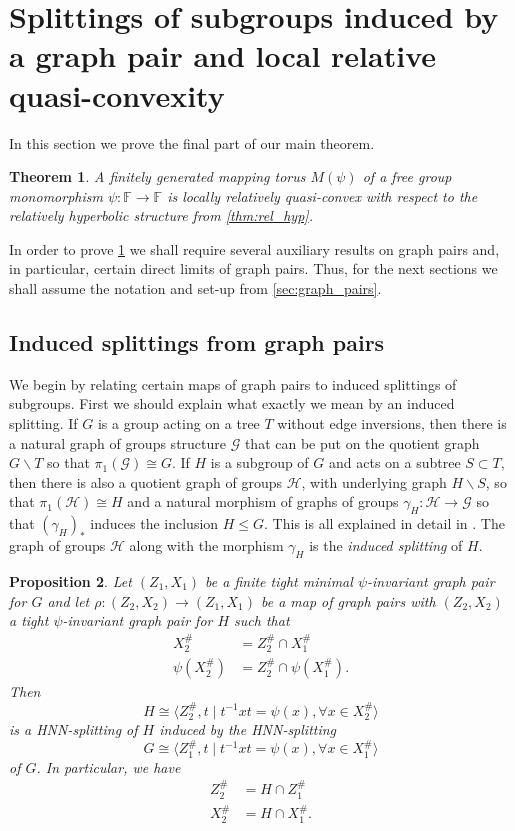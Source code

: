 \documentclass[11pt, a4paper]{amsart}
\newtheorem{theorem}{Theorem}[section]
\newtheorem{proposition}[theorem]{Proposition}
\theoremstyle{definition}
\newcommand{\isom}{\cong}
\newcommand{\F}{\mathbb{F}}
\begin{document}
\section{Splittings of subgroups induced by a graph pair and local relative quasi-convexity}
\label{sec:locally_rel_qc}

In this section we prove the final part of our main theorem.

\begin{theorem}
\label{thm:locally_rel_qc}
A finitely generated mapping torus $M(\psi)$ of a free group monomorphism $\psi\colon \F\to \F$ is locally relatively quasi-convex with respect to the relatively hyperbolic structure from \cref{thm:rel_hyp}.
\end{theorem}

In order to prove \cref{thm:locally_rel_qc} we shall require several auxiliary results on graph pairs and, in particular, certain direct limits of graph pairs. Thus, for the next sections we shall assume the notation and set-up from \cref{sec:graph_pairs}.

\subsection{Induced splittings from graph pairs}

We begin by relating certain maps of graph pairs to induced splittings of subgroups. First we should explain what exactly we mean by an induced splitting. If $G$ is a group acting on a tree $T$ without edge inversions, then there is a natural graph of groups structure $\mathcal{G}$ that can be put on the quotient graph $G\backslash T$ so that $\pi_1(\mathcal{G}) \isom G$. If $H$ is a subgroup of $G$ and acts on a subtree $S\subset T$, then there is also a quotient graph of groups $\mathcal{H}$, with underlying graph $H\backslash S$, so that $\pi_1(\mathcal{H}) \isom H$ and a natural morphism of graphs of groups $\gamma_H\colon \mathcal{H}\to\mathcal{G}$ so that $(\gamma_H)_*$ induces the inclusion $H\leqslant G$. This is all explained in detail in \cite{Se80,Ba93}. The graph of groups $\mathcal{H}$ along with the morphism $\gamma_H$ is the \emph{induced splitting} of $H$.

\begin{proposition}
\label{prop:intersection}
Let $(Z_1, X_1)$ be a finite tight minimal $\psi$-invariant graph pair for $G$ and let $\rho\colon (Z_2, X_2)\to (Z_1, X_1)$ be a map of graph pairs with $(Z_2, X_2)$ a tight $\psi$-invariant graph pair for $H$ such that
\begin{align*}
X_2^{\#} &= Z_2^{\#}\cap X_1^{\#}\\
\psi(X_2^{\#}) &= Z_2^{\#}\cap \psi(X_1^{\#}).
\end{align*}
Then
\[
H\isom \langle Z_2^{\#}, t \mid t^{-1}xt = \psi(x), \forall x\in X_2^{\#}\rangle
\]
is a HNN-splitting of $H$ induced by the HNN-splitting
\[
G \isom \langle Z_1^{\#}, t \mid t^{-1}xt = \psi(x), \forall x\in X_1^{\#}\rangle
\]
of $G$. In particular, we have
\begin{align*}
Z_2^{\#} &= H\cap Z_1^{\#}\\
X_2^{\#} &= H\cap X_1^{\#}.
\end{align*}
\end{proposition}
\end{document}
